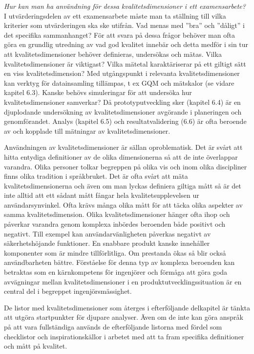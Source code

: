 \emph{Hur kan man ha användning för dessa kvalitetsdimensioner i ett
examensarbete?} I utvärderingsdelen av ett examensarbete måste man ta
ställning till vilka kriterier som utvärderingen ska ske utifrån. Vad
menas med ''bra'' och ''dåligt'' i det specifika sammanhanget? För att
svara på dessa frågor behöver man ofta göra en grundlig utredning av vad
god kvalitet innebär och detta medför i sin tur att kvalitetsdimensioner
behöver definieras, undersökas och mätas. Vilka kvalitetsdimensioner är
viktigast? Vilka mätetal karaktäriserar på ett giltigt sätt en viss
kvalitetsdimension? Med utgångspunkt i relevanta kvalitetsdimensioner
kan verktyg för datainsamling tillämpas, t ex GQM och mätskalor (se
vidare kapitel 6.3). Kanske behövs simuleringar för att undersöka hur
kvalitetsdimensioner samverkar? Då prototyputveckling sker (kapitel 6.4)
är en djuplodande undersökning av kvalitetsdimensioner avgörande i
planeringen och genomförandet. Analys (kapitel 6.5) och
resultatvalidering (6.6) är ofta beroende av och kopplade till mätningar
av kvalitetsdimensioner.

Användningen av kvalitetsdimensioner är sällan oproblematisk. Det är
svårt att hitta entydiga definitioner av de olika dimensionerna så att
de inte överlappar varandra. Olika personer tolkar begreppen på olika
vis och inom olika discipliner finns olika tradition i språkbruket. Det
är ofta svårt att mäta kvalitetsdimensionerna och även om man lyckas
definiera giltiga mått så är det inte alltid att ett sådant mått fångar
hela kvalitetsupplevelsen ur användarsynvinkel. Ofta krävs många olika
mått för att täcka olika aspekter av samma kvalitetsdimension. Olika
kvalitetsdimensioner hänger ofta ihop och påverkar varandra genom
komplexa inbördes beroenden både positivt och negativt. Till exempel kan
användarvänligheten påverkas negativt av säkerhetshöjande funktioner. En
snabbare produkt kanske innehåller komponenter som är mindre
tillförlitliga. Om prestanda ökas så blir också användbarheten bättre.
Förståelse för denna typ av komplexa beroenden kan betraktas som en
kärnkompetens för ingenjörer och förmåga att göra goda avvägningar
mellan kvalitetsdimensioner i en produktutvecklingssituation är en
central del i begreppet ingenjörsmässighet.

De listor med kvalitetsdimensioner som återges i efterföljande
delkapitel är tänkta att utgöra startpunkter för djupare analyser. Även
om de inte kan göra anspråk på att vara fullständiga används de
efterföljande listorna med fördel som checklistor och inspirationskällor
i arbetet med att ta fram specifika definitioner och mått på kvalitet.

